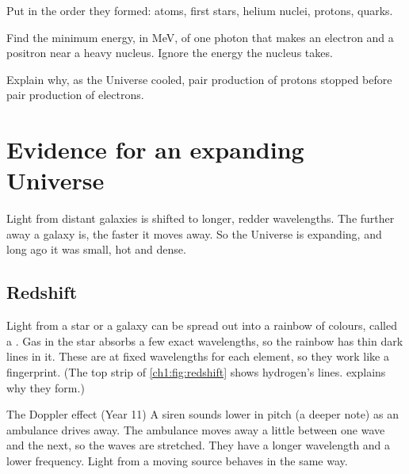 \begin{quickcheck}
  \item Put in the order they formed: atoms, first stars, helium nuclei, protons, quarks.
  \item Find the minimum energy, in MeV, of one photon that makes an electron and a
        positron near a heavy nucleus. Ignore the energy the nucleus takes.
  \item Explain why, as the Universe cooled, pair production of protons stopped before
        pair production of electrons.
\end{quickcheck}

\section{Evidence for an expanding Universe}\label{ch1:sec:expansion}

\begin{bigidea}
Light from distant galaxies is shifted to longer, redder wavelengths. The further away
a galaxy is, the faster it moves away. So the Universe is expanding, and long ago it
was small, hot and dense.
\end{bigidea}

\begin{keywords}
\end{keywords}

\subsection{Redshift}
Light from a star or a galaxy can be spread out into a rainbow of colours, called a
. Gas in the star absorbs a few exact wavelengths, so the rainbow has
thin dark lines in it. These  are at fixed wavelengths for each
element, so they work like a fingerprint. (The top strip of \cref{ch1:fig:redshift}
shows hydrogen's lines.  explains why they form.)

\begin{refresher}{The Doppler effect (Year 11)}
A siren sounds lower in pitch (a deeper note) as an ambulance drives away. The
ambulance moves away a little between one wave and the next, so the waves are
stretched. They have a longer wavelength and a lower frequency. Light from a moving
source behaves in the same way.
\end{refresher}

